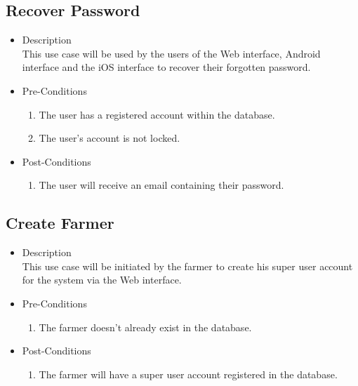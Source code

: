 \documentclass[11pt,fleqn]{book} %
\begin{document}
	\subsection{Recover Password}
	\begin{itemize}
		\item Description\\
		This use case will be used by the users of the Web interface, Android interface and the iOS interface to recover their forgotten password.
		\item Pre-Conditions
		\begin{enumerate}
			\item The user has a registered account within the database.
			\item The user’s account is not locked.
		\end{enumerate}
		\item Post-Conditions
		\begin{enumerate}
			\item The user will receive an email containing their password.
		\end{enumerate}
	\end{itemize}
	
	\subsection{Create Farmer}
	\begin{itemize}
		\item Description\\
		This use case will be initiated by the farmer to create his super user account for the system via the Web interface.
		\item Pre-Conditions
		\begin{enumerate}
			\item The farmer doesn’t already exist in the database.
		\end{enumerate}
		\item Post-Conditions
		\begin{enumerate}
			\item The farmer will have a super user account registered in the database.
		\end{enumerate}
	\end{itemize}
	
\end{document}
